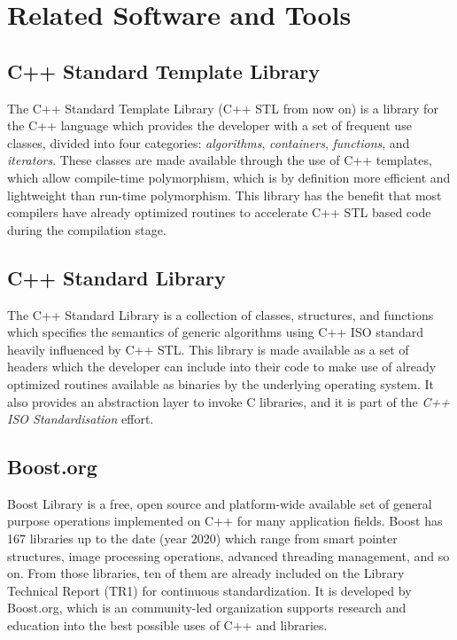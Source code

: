 \section{Related Software and Tools}

\subsection{C++ Standard Template Library}
The C++ Standard Template Library (C++ STL from now on) is a library for the C++ language which provides the developer with a set of frequent use classes, divided into four categories: \textit{algorithms}, \textit{containers}, \textit{functions}, and \textit{iterators}. These classes are made available through the use of C++ templates, which allow compile-time polymorphism, which is by definition more efficient and lightweight than run-time polymorphism. This library has the benefit that most compilers have already optimized routines to accelerate C++ STL based code during the compilation stage.

\subsection{C++ Standard Library}
The C++ Standard Library is a collection of classes, structures, and functions which specifies the semantics of generic algorithms using C++ ISO standard heavily influenced by C++ STL. This library is made available as a set of headers which the developer can include into their code to make use of already optimized routines available as binaries by the underlying operating system. It also provides an abstraction layer to invoke C libraries, and it is part of the \textit{C++ ISO Standardisation} effort.

\subsection{Boost.org}
Boost Library is a free, open source and platform-wide available set of general purpose operations implemented on C++ for many application fields. Boost has 167 libraries up to the date (year 2020) which range from smart pointer structures, image processing operations, advanced threading management, and so on. From those libraries, ten of them are already included on the Library Technical Report (TR1) for continuous standardization. It is developed by Boost.org, which is an community-led organization supports research and education into the best possible uses of C++ and libraries.

